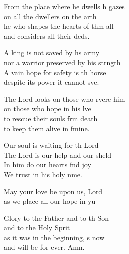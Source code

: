 \begin{psalmverse}
\begin{patverse}
From the place where he dwells h gazes\\
    on all the dwellers on the arth\\
he who shapes the hearts of thm all\\
    and considers all their deds.

A king is not saved by h\pointup{\i}s army\\
    nor a warrior preserved by his strngth\\
A vain hope for safety is th horse\\
    despite its power it cannot sve.

The Lord looks on those who rvere him\\
    on those who hope in his lve\\
to rescue their souls frm death\\
    to keep them alive in fmine.

Our soul is waiting for th Lord\\
    The Lord is our help and our sh\pointup{\i}eld\\
In him do our hearts f\pointup{\i}nd joy\\
    We trust in his holy nme.

May your love be upon us,  Lord\\
    as we place all our hope in yu

Glory to the Father and to th Son\\
    and to the Holy Sp\pointup{\i}rit\\
as it was in the beginning, \pointup{\i}s now\\
    and will be for ever. Amn.
  \end{patverse}
\end{psalmverse}
